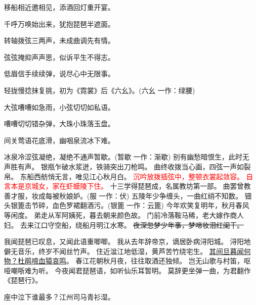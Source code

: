 \documentclass{article}
\begin{document}
移船相近邀相见，添酒回灯重开宴。\par

千呼万唤始出来，犹抱琵琶半遮面。\par

转轴拨弦三两声，未成曲调先有情。\par

弦弦掩抑声声思，似诉平生不得志。\par
低眉信手续续弹，说尽心中无限事。\par
轻拢慢捻抹复挑，初为《霓裳》后《六幺》。(六幺 一作：绿腰)\par

大弦嘈嘈如急雨，小弦切切如私语。\par
嘈嘈切切错杂弹，大珠小珠落玉盘。\par
间关莺语花底滑，幽咽泉流冰下难。\par
冰泉冷涩弦凝绝，凝绝不通声暂歇。(暂歇 一作：渐歇)
别有幽愁暗恨生，此时无声胜有声。
银瓶乍破水浆迸，铁骑突出刀枪鸣。
曲终收拨当心画，四弦一声如裂帛。
东船西舫悄无言，唯见江心秋月白。
\textcolor{red}{
沉吟放拨插弦中，整顿衣裳起敛容。
自言本是京城女，家在虾蟆陵下住。}
十三学得琵琶成，名属教坊第一部。
曲罢曾教善才服，妆成每被秋娘妒。(服 一作：伏)
五陵年少争缠头，一曲红绡不知数。
钿头银篦击节碎，血色罗裙翻酒污。(银篦 一作：云篦)
今年欢笑复明年，秋月春风等闲度。
弟走从军阿姨死，暮去朝来颜色故。
门前冷落鞍马稀，老大嫁作商人妇。
去来江口守空船，绕船月明江水寒。
\sout{夜深忽梦少年事，梦啼妆泪红阑干。}

我闻琵琶已叹息，又闻此语重唧唧。
我从去年辞帝京，谪居卧病浔阳城。
浔阳地僻无音乐，终岁不闻丝竹声。
住近湓江地低湿，黄芦苦竹绕宅生。
\uline{其间旦暮闻何物？杜鹃啼血猿哀鸣}。
春江花朝秋月夜，往往取酒还独倾。
{\color[rgb]{0,0.8,0.2}岂无山歌与村笛，呕哑嘲哳难为听。}
今夜闻君琵琶语，如听仙乐耳暂明。
莫辞更坐弹一曲，为君翻作《琵琶行》。



座中泣下谁最多？江州司马青衫湿。
\end{document}
